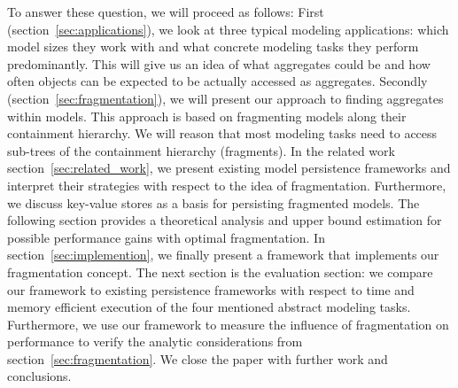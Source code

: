 To answer these question, we will proceed as follows: First (section~\ref{sec:applications}), we look at three typical modeling applications: which model sizes they work with and what concrete modeling tasks they perform predominantly. This will give us an idea of what aggregates could be and how often objects can be expected to be actually accessed as aggregates. 
Secondly (section~\ref{sec:fragmentation}), we will present our approach to finding aggregates within models. This approach is based on fragmenting models along their containment hierarchy. We will reason that most modeling tasks need to access sub-trees of the containment hierarchy (fragments). 
In the related work section~\ref{sec:related_work}, we present existing model persistence frameworks and interpret their strategies with respect to the idea of fragmentation. Furthermore, we discuss key-value stores as a basis for persisting fragmented models.
The following section provides a theoretical analysis and upper bound estimation for possible performance gains with optimal fragmentation.
In section~\ref{sec:implemention}, we finally present a framework that implements our fragmentation concept.
The next section is the evaluation section: we compare our framework to existing persistence frameworks with respect to time and memory efficient execution of the four mentioned abstract modeling tasks. Furthermore, we use our framework to measure the influence of fragmentation on performance to verify the analytic considerations from section~\ref{sec:fragmentation}.
We close the paper with further work and conclusions. 

